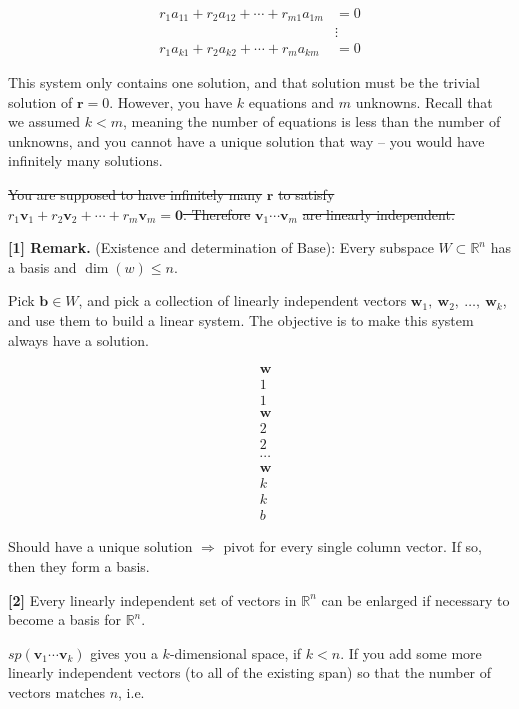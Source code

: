 \documentclass[
]{article}
\begin{document}
\begin{align*}
r_{1}a_{11} + r_{2}a_{12} + \cdots + r_{m1}a_{1m} &= 0
 \\
&\vdots 
 \\
r_{1}a_{k1} + r_{2}a_{k2} + \cdots + r_{m}a_{km} &= 0
\end{align*}


This system only contains one solution, and that solution must be the
trivial solution of $\mathbf{r} = 0$. However, you have $k$
equations and $m$ unknowns. Recall that we assumed $k < m$, meaning
the number of equations is less than the number of unknowns, and you
cannot have a unique solution that way -- you would have infinitely many
solutions.

\sout{You are supposed to have infinitely many} $\mathbf{r}$
\sout{to satisfy}
$r_{1}{\mathbf{v}}_{1} + r_{2}{\mathbf{v}}_{2} + \cdots + r_{m}{\mathbf{v}}_{m} = \mathbf{0}$\sout{.
Therefore} ${\mathbf{v}}_{1}\cdots{\mathbf{v}}_{m}$ \sout{are
linearly independent.}

\textbf{{[}1{]} Remark.} (Existence and determination of Base): Every
subspace $W \subset \mathbb{R}^{n}$ has a basis and
$\dim(w) \leq n$.

Pick $\mathbf{b} \in W$, and pick a collection of linearly
independent vectors
${\mathbf{w}}_{1},\ {\mathbf{w}}_{2},\ \ldots,\ {\mathbf{w}}_{k}$,
and use them to build a linear system. The objective is to make this
system always have a solution.

\begin{align*}
&\mathbf{w} \\
&1 \\
&1 \\
&\mathbf{w} \\
&2 \\
&2 \\
&⋯ \\
&\mathbf{w} \\
&k \\
&k \\
&b
\end{align*}


Should have a unique solution $\Rightarrow$ pivot for every single
column vector. If so, then they form a basis.

\textbf{{[}2{]}} Every linearly independent set of vectors in
$\mathbb{R}^{n}$ can be enlarged if necessary to become a basis for
$\mathbb{R}^{n}$.

$sp\left( {\mathbf{v}}_{1}\cdots{\mathbf{v}}_{k} \right)$
gives you a $k$-dimensional space, if $k < n$. If you add some more
linearly independent vectors (to all of the existing span) so that the
number of vectors matches $n$, i.e.
\end{document}
